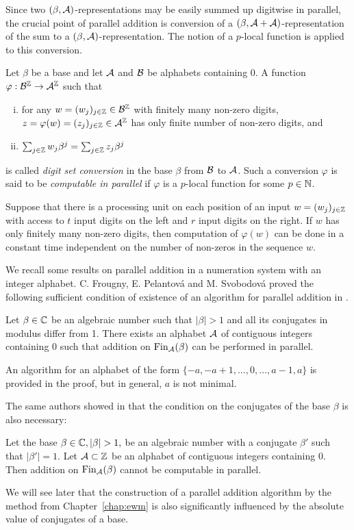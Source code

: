  
Since two $(\beta,\mathcal{A})$-representations may be easily summed up digitwise in parallel, the crucial point of parallel addition is conversion of a $(\beta,\mathcal{A}+\mathcal{A})$-representation of the sum to a $(\beta,\mathcal{A})$-representation. The notion of a $p$-local function is applied to this conversion.
\begin{defn}
\label{def:digitSetConversion}
Let $\beta$ be a base and let $\mathcal{A}$ and $\mathcal{B}$ be alphabets containing 0. A function $\varphi:\mathcal{B}^{\mathbb{Z}}\rightarrow \mathcal{A}^{\mathbb{Z}}$ such that
  \begin{enumerate}[i)]
      \item for any $w=(w_j)_{j\in\mathbb{Z}}\in\mathcal{B}^{\mathbb{Z}}$ with finitely many non-zero digits, $z=\varphi(w)=(z_j)_{j\in\mathbb{Z}}\in\mathcal{A}^{\mathbb{Z}}$ has only finite number of non-zero digits, and
      \item $\sum_{j\in\mathbb{Z}} w_j \beta^j= \sum_{j\in\mathbb{Z}} z_j \beta^j$
  \end{enumerate}
  is called \emph{digit set conversion} in the base $\beta$ from $\mathcal{B}$ to $\mathcal{A}$. Such a conversion $\varphi$ is said to be \emph{computable in parallel} if $\varphi$ is a $p$-local function for some $p\in\mathbb{N}$. 
\end{defn}

Suppose that there is a processing unit on  each position of an input $w=(w_j)_{j\in\mathbb{Z}}$ with access to $t$ input digits on the left and $r$ input digits on the right. If $w$ has only finitely many non-zero digits, then computation of $\varphi(w)$ can be done in a constant time independent on the number of non-zeros in the sequence $w$.

We recall some results on parallel addition in a numeration system with an integer alphabet. C. Frougny, E. Pelantov\'a and M. Svobodov\'a proved  the following sufficient condition of existence of an algorithm for parallel addition in \cite{parAddNS}.
  \begin{thm}
  \label{thm:suffConjugates}
  Let $\beta\in\mathbb{C}$ be an algebraic number such that $|\beta|>1$ and all its conjugates in modulus differ from 1. There exists an alphabet $\mathcal{A}$ of contiguous integers containing 0 such that addition on $\text{Fin}_{\mathcal{A}}(\beta)$ can be performed in parallel.
  \end{thm}
An algorithm for an alphabet of the form $\{-a,-a+1, \dots,0,\dots,a-1,a\}$ is provided in the proof, but in general, $a$ is not minimal.
    
The same authors showed in \cite{kBlock} that the condition on the conjugates of the base $\beta$ is also necessary:
  \begin{thm}
  Let the base $\beta\in\CC, |\beta|>1,$ be an algebraic number with a conjugate $\beta'$ such that $|\beta'|=1$. Let $\mathcal{A}\subset\mathbb{Z}$ be an alphabet of contiguous integers containing 0. Then addition on $\text{Fin}_{\mathcal{A}}(\beta)$ cannot be computable in parallel.
  \end{thm}
We will see later that the construction of a parallel addition algorithm by the method from Chapter~\ref{chap:ewm} is also significantly influenced by the absolute value of conjugates of a base.
  

